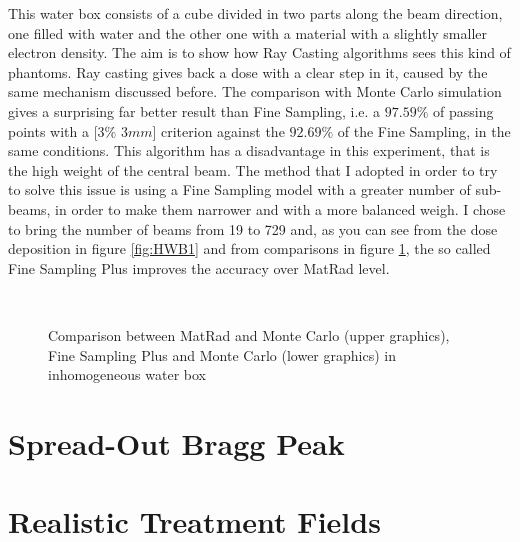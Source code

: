 \documentclass[12pt, a4paper, twoside]{book}
\begin{document}
This water box consists of a cube divided in two parts along the beam direction, one filled with water and the other one with a material with a slightly smaller electron density.
The aim is to show how Ray Casting algorithms sees this kind of phantoms.
Ray casting gives back a dose with a clear step in it, caused by the same mechanism discussed before. The comparison with Monte Carlo simulation gives a surprising far better result than Fine Sampling, i.e. a $97.59\%$ of passing points with a [$3\%$ $3mm$] criterion against the $92.69\%$ of the Fine Sampling, in the same conditions. This algorithm has a disadvantage in this experiment, that is the high weight of the central beam. The method that I adopted in order to try to solve this issue is using a Fine Sampling model with a greater number of sub-beams, in order to make them narrower and with a more balanced weigh. I chose to bring the number of beams from 19 to 729 and, as you can see from the dose deposition in figure \ref{fig:HWB1} and from comparisons in figure \ref{fig:HWB1gam}, the so called Fine Sampling Plus  improves the accuracy over MatRad level.


\begin{figure}[!ht]
\centering
{} 
 \\
\caption{Comparison between MatRad and Monte Carlo (upper graphics), Fine Sampling Plus and Monte Carlo (lower graphics) in inhomogeneous water box}
\label{fig:HWB1gam}
\end{figure}





\newpage

\section{Spread-Out Bragg Peak}

\section{Realistic Treatment Fields}
\end{document}
